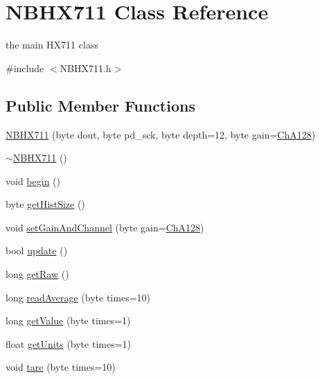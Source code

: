 \hypertarget{class_n_b_h_x711}{}\section{N\+B\+H\+X711 Class Reference}
\label{class_n_b_h_x711}


the main H\+X711 class  




{\ttfamily \#include $<$N\+B\+H\+X711.\+h$>$}

\subsection*{Public Member Functions}
\begin{DoxyCompactItemize}
\item 
\hyperlink{class_n_b_h_x711_ad23a6432bb4615da5d77433c7b5028be}{N\+B\+H\+X711} (byte dout, byte pd\+\_\+sck, byte depth=12, byte gain=\hyperlink{_n_b_h_x711_8h_aed3330beebe77c0cd49207584f624d86a622bf1aeb6d57be63f86d39c8bfd53e1}{Ch\+A128})
\item 
\hyperlink{class_n_b_h_x711_a06c87d88b558598e1c5c5bbbe605884d}{$\sim$\+N\+B\+H\+X711} ()
\item 
void \hyperlink{class_n_b_h_x711_a447f1e82576e7f5fcf4e5f71c4edf9ce}{begin} ()
\item 
byte \hyperlink{class_n_b_h_x711_ae12eee691226d1ba83a97bf7562f9847}{get\+Hist\+Size} ()
\item 
void \hyperlink{class_n_b_h_x711_a802d60de582161056e577b4c6d32ba53}{set\+Gain\+And\+Channel} (byte gain=\hyperlink{_n_b_h_x711_8h_aed3330beebe77c0cd49207584f624d86a622bf1aeb6d57be63f86d39c8bfd53e1}{Ch\+A128})
\item 
bool \hyperlink{class_n_b_h_x711_a30b9658963785c0dfd3ad490111d1180}{update} ()
\item 
long \hyperlink{class_n_b_h_x711_a4df2657394217ebe09eafb1b843124ed}{get\+Raw} ()
\item 
long \hyperlink{class_n_b_h_x711_ac1f2090347e4f56911cf9d8aae81b8f1}{read\+Average} (byte times=10)
\item 
long \hyperlink{class_n_b_h_x711_aeca589479761846f5e96343dd7251578}{get\+Value} (byte times=1)
\item 
float \hyperlink{class_n_b_h_x711_a48ff4a2c0b428911a850f6c2bea833f3}{get\+Units} (byte times=1)
\item 
void \hyperlink{class_n_b_h_x711_a130b9daba88bb002cd4a6d4591105c71}{tare} (byte times=10)
\item 

\end{DoxyCompactItemize}
